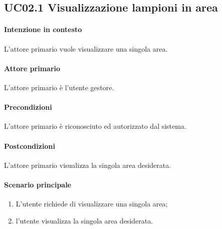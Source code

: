 \subsection{UC02.1 Visualizzazione lampioni in area}
\paragraph{Intenzione in contesto} L'attore primario vuole visualizzare una singola area.

\paragraph{Attore primario} L'attore primario è l'utente gestore.
\paragraph{Precondizioni}L'attore primario è riconosciuto ed autorizzato dal sistema.
\paragraph{Postcondizioni} L'attore primario visualizza la singola area desiderata.

\paragraph{Scenario principale}
\begin{enumerate}
    \item L'utente richiede di visualizzare una singola area;
    \item l'utente visualizza la singola area desiderata.
\end{enumerate}
